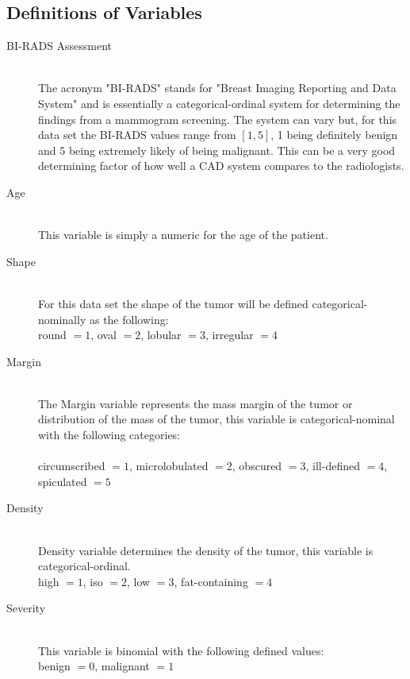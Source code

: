 \documentclass{article}
\begin{document}
\subsection{Definitions of Variables}
\label{definitions}
\begin{description}
\item[BI-RADS Assessment] 
\hfill \\
The acronym "BI-RADS" stands for "Breast Imaging Reporting and Data System" and is essentially a categorical-ordinal system for determining the findings from a mammogram screening. The system can vary but, for this data set the BI-RADS values range from $[1,5]$, 1 being definitely benign and 5 being extremely likely of being malignant. This can be a very good determining factor of how well a CAD system compares to the radiologists.\\

\item[Age] 
\hfill \\
This variable is simply a numeric for the age of the patient. \\

\newpage
\item[Shape]
\hfill \\
For this data set the shape of the tumor will be defined categorical-nominally as the following: \\

round $=1$, oval $=2$, lobular $=3$, irregular $=4$ \\

\item[Margin]
\hfill \\
The Margin variable represents the mass margin of the tumor or distribution of the mass of the tumor, this variable is categorical-nominal with the following categories:\\
\hfill \\
circumscribed $=1$, microlobulated $=2$, obscured $=3$, ill-defined $=4$, spiculated $=5$ \\

\item[Density]
\hfill \\
Density variable determines the density of the tumor, this variable is categorical-ordinal.\\

high $=1$, iso $=2$, low $=3$, fat-containing $=4$ \\

\item[Severity]
\hfill \\
This variable is binomial with the following defined values: \\

benign $=0$, malignant $=1$ \\

\end{description} 
 
\end{document}
